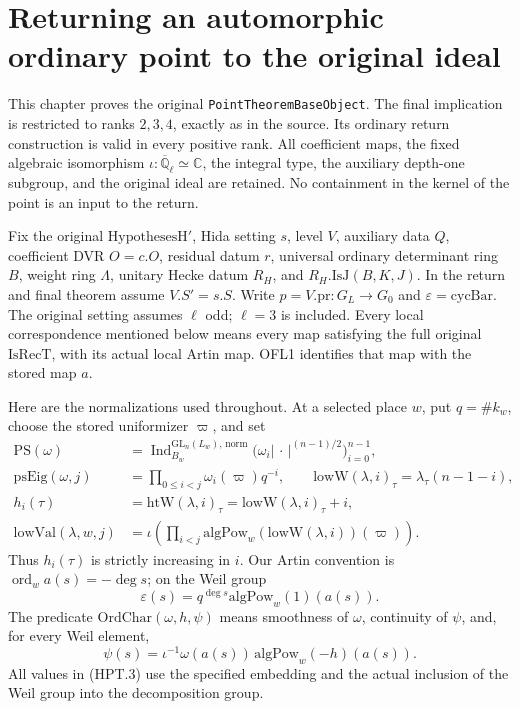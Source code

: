 \documentclass[11pt,a4paper]{article}
\numberwithin{equation}{section}
\theoremstyle{remark}\newtheorem{remark}[theorem]{Remark}
\begin{document}
\section{Returning an automorphic ordinary point to the original ideal}
\label{sec:hida-point-return-v45}

This chapter proves the original \texttt{Point\allowbreak Theorem\allowbreak Base\allowbreak Object}.
The final implication is restricted to ranks $2,3,4$, exactly as in
the source.  Its ordinary return construction is valid in every
positive rank.  All coefficient maps, the fixed algebraic isomorphism
$\iota:\overline{\mathbb Q}_\ell\simeq\mathbb C$, the integral type,
the auxiliary depth-one subgroup, and the original ideal are retained.
No containment in the kernel of the point is an input to the return.

Fix the original $\mathrm{HypothesesH}'$, Hida setting $s$, level $V$,
auxiliary data $Q$, coefficient DVR $O=c.O$, residual datum $r$,
universal ordinary determinant ring $B$, weight ring $\Lambda$,
unitary Hecke datum $R_H$, and $R_H.\mathrm{IsJ}(B,K,J)$.
In the return and final theorem assume $V.S'=s.S$.
Write $p=V.\mathrm{pr}:G_L\to G_0$ and $\varepsilon=\mathrm{cycBar}$.
The original setting assumes $\ell$ odd; $\ell=3$ is included.
Every local correspondence mentioned below means every map satisfying
the full original $\mathrm{IsRecT}$, with its actual local Artin map.
OFL1 identifies that map with the stored map $a$.

Here are the normalizations used throughout.  At a selected place $w$,
put $q=\#k_w$, choose the stored uniformizer $\varpi$, and set
\[
 \begin{split}
 \mathrm{PS}(\omega)&=\operatorname{Ind}_{B_w}^{\mathrm{GL}_n(L_w),\,\mathrm{norm}}
       \bigl(\omega_i|\,\cdot\,|^{(n-1)/2}\bigr)_{i=0}^{n-1},\\
 \mathrm{psEig}(\omega,j)&=\prod_{0\leq i<j}\omega_i(\varpi)q^{-i},
 \qquad \mathrm{lowW}(\lambda,i)_\tau=\lambda_\tau(n-1-i),\\
 h_i(\tau)&=\mathrm{htW}(\lambda,i)_\tau
                       =\mathrm{lowW}(\lambda,i)_\tau+i,\\
 \mathrm{lowVal}(\lambda,w,j)&=
       \iota\left(\prod_{i<j}\mathrm{algPow}_w
                            (\mathrm{lowW}(\lambda,i))(\varpi)\right).
 \end{split}                                                   \tag{HPT.1}
\]
Thus $h_i(\tau)$ is strictly increasing in $i$.
Our Artin convention is $\operatorname{ord}_w a(s)=-\deg s$;
on the Weil group
\[
 \varepsilon(s)=q^{\deg s}\mathrm{algPow}_w(1)(a(s)).              \tag{HPT.2}
\]
The predicate $\mathrm{OrdChar}(\omega,h,\psi)$ means smoothness of
$\omega$, continuity of $\psi$, and, for every Weil element,
\[
 \psi(s)=\iota^{-1}\omega(a(s))\,
                                \mathrm{algPow}_w(-h)(a(s)).    \tag{HPT.3}
\]
All values in (HPT.3) use the specified embedding and the actual
inclusion of the Weil group into the decomposition group.
\end{document}
